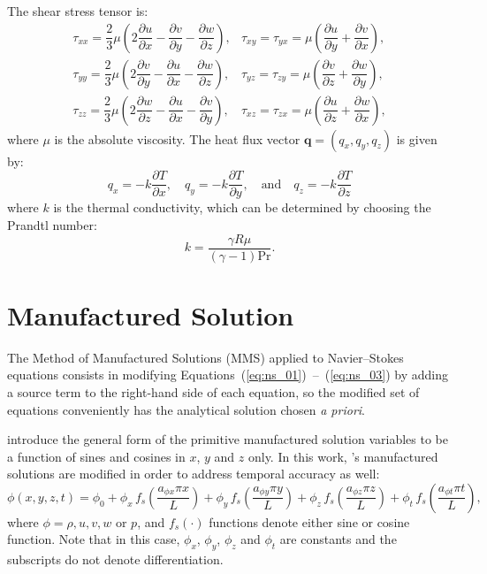 \documentclass[10pt]{article}
\newcommand{\diff}[2] {\dfrac{\partial #1}{\partial #2}}
\begin{document}
The shear stress tensor is:
\begin{equation}
 \begin{array}{lll}
  \tau_{xx}= \dfrac{2}{3}  \mu \left( 2 \diff{u}{x} - \diff{v}{y} -\diff{w}{z} \right),
  &\tau_{xy}= \tau_{yx}=\mu \left( \diff{u}{y} + \diff{v}{x}\right),\\
  \tau_{yy}= \dfrac{2}{3}  \mu \left( 2 \diff{v}{y} - \diff{u}{x} -\diff{w}{z} \right),
  &\tau_{yz}= \tau_{zy}=\mu \left( \diff{v}{z} + \diff{w}{y}\right),\\
  \tau_{zz}= \dfrac{2}{3}  \mu \left( 2 \diff{w}{z} - \diff{u}{x} -\diff{v}{y} \right),
  &\tau_{xz}= \tau_{zx}=\mu \left( \diff{u}{z} + \diff{w}{x}\right),
 \end{array}
\end{equation}
where $\mu$ is the absolute viscosity. The heat flux vector $\mathbf{q}=(q_x,q_y,q_z)$ is given by:
\begin{equation}
 q_x = - k \diff{T}{x}, \quad q_y = - k \diff{T}{y}, \quad \mbox{and} \quad q_z = - k \diff{T}{z}
 \end{equation}
where $k$ is the thermal conductivity, which can be determined by choosing the Prandtl number:
$$k= \dfrac{\gamma R \mu}{ (\gamma-1) \text{Pr}}.$$

\section{Manufactured Solution}

The Method of Manufactured Solutions (MMS) applied to Navier--Stokes equations consists in modifying Equations~(\ref{eq:ns_01})~--~(\ref{eq:ns_03}) by adding a source term to the right-hand side of each equation, so the modified set of equations conveniently has the analytical solution chosen \textit{a priori}.

\citet{Roy2002} introduce the general form of the primitive manufactured solution variables to be  a function of sines and cosines in $x$, $y$ and $z$ only. In this work, \citet{Roy2002}'s manufactured solutions are modified in order to address temporal accuracy as well:
\begin{equation}
 \label{eq:manufactured01}
  \phi (x,y,z,t) = \phi_0+ \phi_x\, f_s \left(\frac{a_{\phi x} \pi x}{L} \right) +  \phi_y \,f_s\left(\frac{a_{\phi y} \pi y}{L}\right) + \phi_z \,f_s\left(\frac{a_{\phi z} \pi z}{L}\right)+ \phi_t \,f_s\left(\frac{a_{\phi t} \pi t}{L}\right),
\end{equation}
where $\phi=\rho,u,v,w$ or $p$, and $f_s(\cdot)$ functions denote either sine or cosine function. Note that in this case, $\phi_x$, $\phi_y$, $\phi_z$  and $\phi_t$ are constants  and the subscripts do not denote differentiation.
\end{document}
